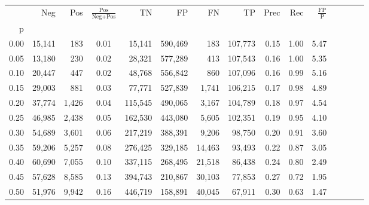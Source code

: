 \begin{tabular}{rrrcrrrrrrrrrrr}
\toprule
{} &     Neg &     Pos & $\frac{\text{Pos}}{\text{Neg}+\text{Pos}}$ &       TN &       FP &       FN &       TP &  Prec &   Rec & $\frac{\text{FP}}{\text{P}}$ \\
p    &         &         &                                            &          &          &          &          &       &       &                              \\
\midrule
0.00 &  15,141 &     183 &                                       0.01 &   15,141 &  590,469 &      183 &  107,773 &  0.15 &  1.00 &                         5.47 \\
0.05 &  13,180 &     230 &                                       0.02 &   28,321 &  577,289 &      413 &  107,543 &  0.16 &  1.00 &                         5.35 \\
0.10 &  20,447 &     447 &                                       0.02 &   48,768 &  556,842 &      860 &  107,096 &  0.16 &  0.99 &                         5.16 \\
0.15 &  29,003 &     881 &                                       0.03 &   77,771 &  527,839 &    1,741 &  106,215 &  0.17 &  0.98 &                         4.89 \\
0.20 &  37,774 &   1,426 &                                       0.04 &  115,545 &  490,065 &    3,167 &  104,789 &  0.18 &  0.97 &                         4.54 \\
0.25 &  46,985 &   2,438 &                                       0.05 &  162,530 &  443,080 &    5,605 &  102,351 &  0.19 &  0.95 &                         4.10 \\
0.30 &  54,689 &   3,601 &                                       0.06 &  217,219 &  388,391 &    9,206 &   98,750 &  0.20 &  0.91 &                         3.60 \\
0.35 &  59,206 &   5,257 &                                       0.08 &  276,425 &  329,185 &   14,463 &   93,493 &  0.22 &  0.87 &                         3.05 \\
0.40 &  60,690 &   7,055 &                                       0.10 &  337,115 &  268,495 &   21,518 &   86,438 &  0.24 &  0.80 &                         2.49 \\
0.45 &  57,628 &   8,585 &                                       0.13 &  394,743 &  210,867 &   30,103 &   77,853 &  0.27 &  0.72 &                         1.95 \\
0.50 &  51,976 &   9,942 &                                       0.16 &  446,719 &  158,891 &   40,045 &   67,911 &  0.30 &  0.63 &                         1.47 \\

\end{tabular}
